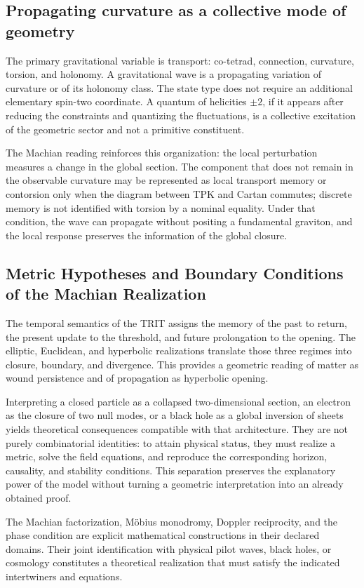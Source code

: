 \subsection{Propagating curvature as a collective mode of geometry}

The primary gravitational variable is transport: co-tetrad, connection,
curvature, torsion, and holonomy. A gravitational wave is a propagating
variation of curvature or of its holonomy class. The state type does not
require an additional elementary spin-two coordinate. A quantum of
helicities \(\pm2\), if it appears after reducing the constraints and
quantizing the fluctuations, is a collective excitation of the
geometric sector and not a primitive constituent.

The Machian reading reinforces this organization: the local perturbation measures
a change in the global section. The component that does not remain in the
observable curvature may be represented as local transport memory or
contorsion only when the diagram between TPK and Cartan commutes; discrete
memory is not identified with torsion by a nominal equality. Under that
condition, the wave can propagate without positing a fundamental graviton, and
the local response preserves the information of the global closure.

\subsection{Metric Hypotheses and Boundary Conditions of the Machian Realization}

The temporal semantics of the TRIT assigns the memory of the past to return, the present update to the threshold, and future prolongation to the opening. The elliptic, Euclidean, and hyperbolic realizations translate those three regimes into closure, boundary, and divergence. This provides a geometric reading of matter as wound persistence and of propagation as hyperbolic opening.

Interpreting a closed particle as a collapsed two-dimensional section, an electron as the closure of two null modes, or a black hole as a global inversion of sheets yields theoretical consequences compatible with that architecture. They are not purely combinatorial identities: to attain physical status, they must realize a metric, solve the field equations, and reproduce the corresponding horizon, causality, and stability conditions. This separation preserves the explanatory power of the model without turning a geometric interpretation into an already obtained proof.

\begin{statusbox}
The Machian factorization, Möbius monodromy, Doppler reciprocity, and the phase condition are explicit mathematical constructions in their declared domains. Their joint identification with physical pilot waves, black holes, or cosmology constitutes a theoretical realization that must satisfy the indicated intertwiners and equations.
\end{statusbox}
